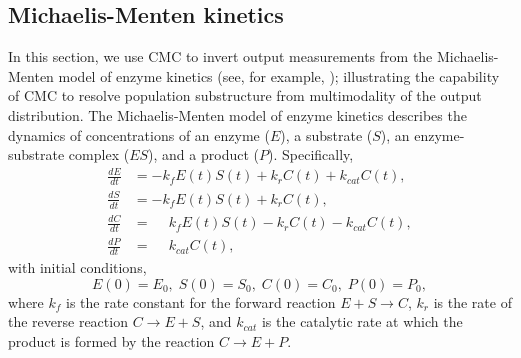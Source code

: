 \subsection{Michaelis-Menten kinetics}
In this section, we use CMC to invert output measurements from the Michaelis-Menten model of enzyme kinetics (see, for example, \cite{murray2007mathematical}); illustrating the capability of CMC to resolve population substructure from multimodality of the output distribution. The Michaelis-Menten model of enzyme kinetics describes the dynamics of concentrations of an enzyme ($E$), a substrate ($S$), an enzyme-substrate complex ($ES$), and a product ($P$). Specifically,
%
\begin{equation}\label{eq:michaelis_menten}
\begin{aligned}
\frac{dE}{dt} &= -k_f E(t)S(t) + k_r C(t) + k_{cat} C(t), \\
\frac{dS}{dt} &= -k_f E(t)S(t) + k_r C(t), \\
\frac{dC}{dt} &= \phantom{-}k_f E(t)S(t) - k_r C(t) - k_{cat} C(t), \\
\frac{dP}{dt} &= \phantom{-}k_{cat} C(t),
\end{aligned}
\end{equation}
%
with initial conditions,
\begin{equation}
E(0) = E_0, \; S(0)=S_0, \; C(0)=C_0, \; P(0)=P_0,
\end{equation}
%
where $k_f$ is the rate constant for the forward reaction $E+S \rightarrow C$, $k_r$ is the rate of the reverse reaction $C \rightarrow E+S$, and $k_{cat}$ is the catalytic rate at which the product is formed by the reaction $C \rightarrow E + P$.

